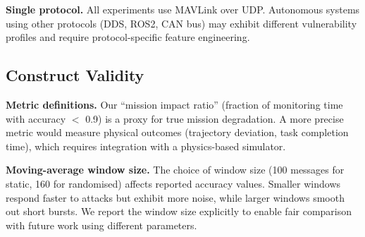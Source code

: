 \textbf{Single protocol.}
All experiments use MAVLink over UDP.
Autonomous systems using other protocols (DDS, ROS2, CAN bus) may exhibit different vulnerability profiles and require protocol-specific feature engineering.

\subsection{Construct Validity}

\textbf{Metric definitions.}
Our ``mission impact ratio'' (fraction of monitoring time with accuracy $<$ 0.9) is a proxy for true mission degradation.
A more precise metric would measure physical outcomes (trajectory deviation, task completion time), which requires integration with a physics-based simulator.

\textbf{Moving-average window size.}
The choice of window size (100 messages for static, 160 for randomised) affects reported accuracy values.
Smaller windows respond faster to attacks but exhibit more noise, while larger windows smooth out short bursts.
We report the window size explicitly to enable fair comparison with future work using different parameters.
